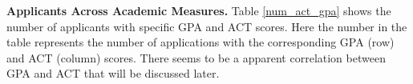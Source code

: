 \documentclass[12pt,english]{report}
\begin{document}
\vspace{0.1in}
\noindent \textbf{Applicants Across Academic Measures.}  Table \ref{num_act_gpa} shows the number of applicants with specific GPA and ACT scores.  Here the number in the table represents the number of applications with the corresponding GPA (row) and ACT (column) scores. There seems to be a apparent correlation between GPA and ACT that will be discussed later. 

\begin{table}
\end{table}
\end{document}
